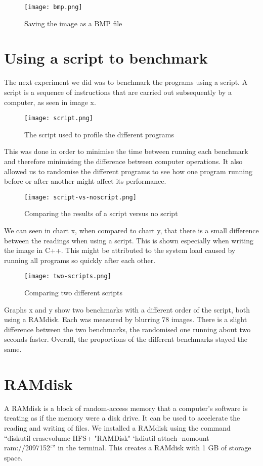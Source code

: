 \begin{figure}[H]
	\centering
	\texttt{[image: bmp.png]}
	\caption{Saving the image as a BMP file}
	\label{figure:bmp}
\end{figure}

\section{Using a script to benchmark}
The next experiment we did was to benchmark the programs using a script. A script is a sequence of instructions that are carried out subsequently by a computer, as seen in image x.

\begin{figure}[H]
	\centering
	\texttt{[image: script.png]}
	\caption{The script used to profile the different programs}
	\label{figure:script}
\end{figure}

This was done in order to minimise the time between running each benchmark and therefore minimising the difference between computer operations. It also allowed us to randomise the different programs to see how one program running before or after another might affect its performance.

\begin{figure}[H]
	\centering
	\texttt{[image: script-vs-noscript.png]}
	\caption{Comparing the results of a script versus no script}
	\label{figure:script-vs-noscript}
\end{figure}

We can seen in chart x, when compared to chart y, that there is a small difference between the readings when using a script. This is shown especially when writing the image in C++. This might be attributed to the system load caused by running all programs so quickly after each other.

\begin{figure}[H]
	\centering
	\texttt{[image: two-scripts.png]}
	\caption{Comparing two different scripts}
	\label{figure:two-scripts}
\end{figure}

Graphs x and y show two benchmarks with a different order of the script, both using a RAMdisk. Each was measured by blurring 78 images. There is a slight difference between the two benchmarks, the randomised one running about two seconds faster. Overall, the proportions of the different benchmarks stayed the same.

\section{RAMdisk}
A RAMdisk is a block of random-access memory that a computer's software is treating as if the memory were a disk drive. It can be used to accelerate the reading and writing of files. We installed a RAMdisk using the command “diskutil erasevolume HFS+ "RAMDisk" `hdiutil attach -nomount ram://2097152`” in the terminal. This creates a RAMdisk with 1 GB of storage space.

